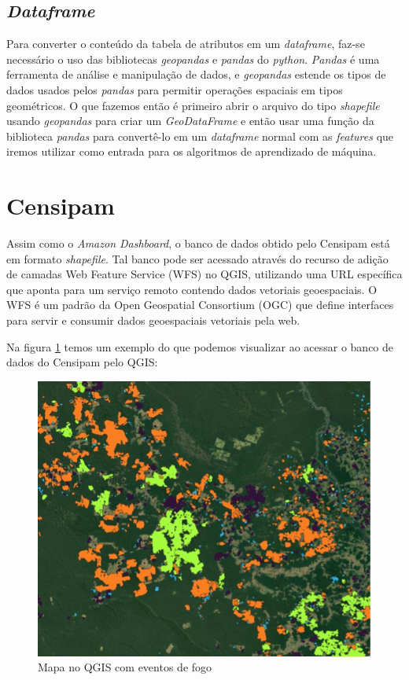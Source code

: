 \subsection{\textit{Dataframe}}

Para converter o conteúdo da tabela de atributos em um \textit{dataframe}, faz-se necessário o uso das bibliotecas \textit{geopandas} e \textit{pandas} do \textit{python}. \textit{Pandas} é uma ferramenta de análise e manipulação de dados, e \textit{geopandas} estende os tipos de dados usados pelos \textit{pandas} para permitir operações espaciais em tipos geométricos. O que fazemos então é primeiro abrir o arquivo do tipo \textit{shapefile} usando \textit{geopandas} para criar um \textit{GeoDataFrame} e então usar uma função da biblioteca \textit{pandas} para convertê-lo em um \textit{dataframe} normal com as \textit{features} que iremos utilizar como entrada para os algoritmos de aprendizado de máquina.

\section{Censipam}
\label{sec:censipamBD}

Assim como o \textit{Amazon Dashboard}, o banco de dados obtido pelo Censipam está em formato \textit{shapefile}. Tal banco pode ser acessado através do recurso de adição de camadas Web Feature Service (WFS) no QGIS, utilizando uma URL específica que aponta para um serviço remoto contendo dados vetoriais geoespaciais. O WFS é um padrão da Open Geospatial Consortium (OGC) que define interfaces para servir e consumir dados geoespaciais vetoriais pela web.

Na figura \ref{fig:qgiscensipam} temos um exemplo do que podemos visualizar ao acessar o banco de dados do Censipam pelo QGIS:

\begin{figure}[htb]
	\centering
	\begin{minipage}{0.6\linewidth}
		\centering
		\includegraphics[width=\linewidth]{tg1/figuras/mapa_censipam.png}
		\caption{Mapa no QGIS com eventos de fogo} \label{fig:qgiscensipam}
	\end{minipage}
\end{figure}

